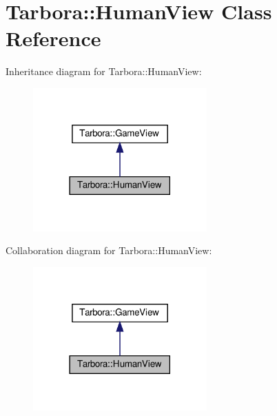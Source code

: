 \hypertarget{classTarbora_1_1HumanView}{}\section{Tarbora\+:\+:Human\+View Class Reference}
\label{classTarbora_1_1HumanView}


Inheritance diagram for Tarbora\+:\+:Human\+View\+:\nopagebreak
\begin{figure}[H]
\begin{center}
\leavevmode
\includegraphics[width=189pt]{classTarbora_1_1HumanView__inherit__graph}
\end{center}
\end{figure}


Collaboration diagram for Tarbora\+:\+:Human\+View\+:\nopagebreak
\begin{figure}[H]
\begin{center}
\leavevmode
\includegraphics[width=189pt]{classTarbora_1_1HumanView__coll__graph}
\end{center}
\end{figure}
